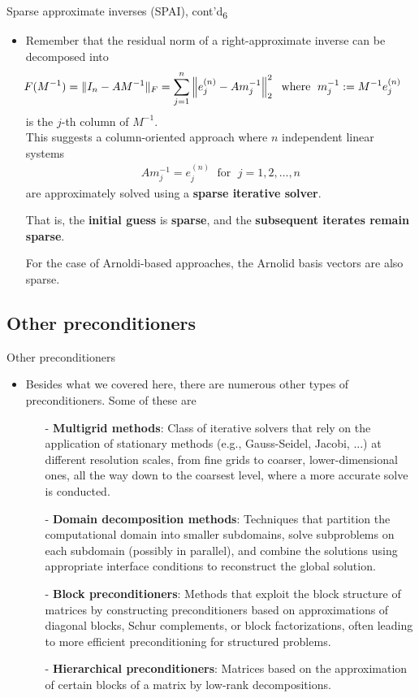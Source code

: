 \documentclass[t,usepdftitle=false]{beamer}
\begin{document}
\begin{frame}{Sparse approximate inverses (SPAI), cont'd\textsubscript{6}}
\begin{itemize}
\item Remember that the residual norm of a right-approximate inverse can be decomposed into
\begin{align*}
\hspace{-.5cm}
F(M^{-1})
=\|I_n-AM^{-1}\|_F
=\sum_{j=1}^n\left\|e_j^{(n)}-Am_j^{-1}\right\|_2^2
\;\text{ where }\;
m_j^{-1}:=M^{-1}e_j^{(n)}
\end{align*}
is the $j$-th column of $M^{-1}$.\\
This suggests a column-oriented approach where $n$ independent linear systems
\begin{align*}
Am_j^{-1}=e_j^{(n)}
\;\text{ for }\;
j=1,2,\dots,n
\end{align*}
are approximately solved using a \textbf{sparse iterative solver}.
\item[] That is, the \textbf{initial guess} is \textbf{sparse}, and the \textbf{subsequent iterates remain sparse}.
\item[] For the case of Arnoldi-based approaches, the Arnolid basis vectors are also sparse.
\end{itemize}
\end{frame}

\subsection{Other preconditioners}
\begin{frame}{Other preconditioners}
\begin{itemize}
\item Besides what we covered here, there are numerous other types of preconditioners.
Some of these are
\begin{itemize}\normalsize
\item[-] \textbf{Multigrid methods}:
Class of iterative solvers that rely on the application of stationary methods (e.g., Gauss-Seidel, Jacobi, ...) at different resolution scales, from fine grids to coarser, lower-dimensional ones, all the way down to the coarsest level, where a more accurate solve is conducted.
\item[-] \textbf{Domain decomposition methods}:
Techniques that partition the computational domain into smaller subdomains, solve subproblems on each subdomain (possibly in parallel), and combine the solutions using appropriate interface conditions to reconstruct the global solution.
\item[-] \textbf{Block preconditioners}:
Methods that exploit the block structure of matrices by constructing preconditioners based on approximations of diagonal blocks, Schur complements, or block factorizations, often leading to more efficient preconditioning for structured problems.
\item[-] \textbf{Hierarchical preconditioners}:
Matrices based on the approximation of certain blocks of a matrix by low-rank decompositions.
\end{itemize}
\end{itemize}
\end{frame}
\end{document}
